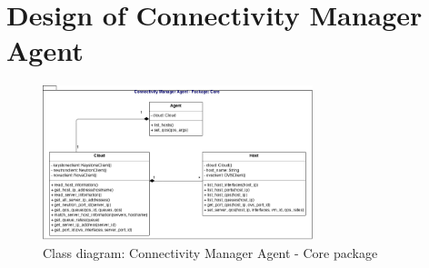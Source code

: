 

\newpage
\section{Design of Connectivity Manager Agent}

\begin{figure}[H]
\centering

\includegraphics[width=0.7\textwidth]{images/design/cm_agent_class_diagram}

\caption{Class diagram: Connectivity Manager Agent - Core package}
\end{figure}


